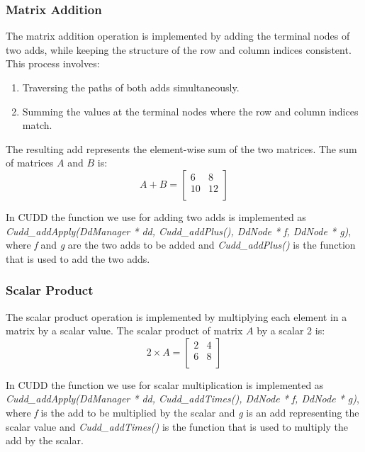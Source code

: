 \subsubsection{Matrix Addition}
The matrix addition operation is implemented by adding the terminal nodes of two \glspl{add}, while keeping the structure of the row and column indices consistent. 
This process involves:
\begin{enumerate}
    \item Traversing the paths of both \glspl{add} simultaneously.
    \item Summing the values at the terminal nodes where the row and column indices match.
\end{enumerate}
The resulting \gls{add} represents the element-wise sum of the two matrices.
The sum of matrices $A$ and $B$ is:
\[
    A + B = \begin{bmatrix}
        6  & 8  \\
        10 & 12 \\
    \end{bmatrix}
\]

In CUDD the function we use for adding two \glspl{add} is implemented as \textit{Cudd\_addApply(DdManager * dd, Cudd\_addPlus(), DdNode * f, DdNode * g)}, where \textit{f} and \textit{g} are the two \glspl{add} to be added and \textit{Cudd\_addPlus()} is the function that is used to add the two \glspl{add}.

\subsubsection{Scalar Product}
The scalar product operation is implemented by multiplying each element in a matrix by a scalar value.
The scalar product of matrix $A$ by a scalar 2 is:
\[
2 \times A = \begin{bmatrix}
    2 & 4 \\
    6 & 8 \\
\end{bmatrix}
\] 

In CUDD the function we use for scalar multiplication is implemented as \textit{Cudd\_addApply(DdManager * dd, Cudd\_addTimes(), DdNode * f, DdNode * g)}, where \textit{f} is the \gls{add} to be multiplied by the scalar and \textit{g} is an \gls{add} representing the scalar value and \textit{Cudd\_addTimes()} is the function that is used to multiply the \gls{add} by the scalar. 

